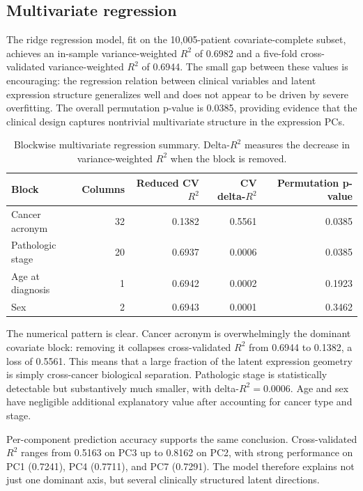\documentclass[11pt]{article}
\begin{document}
\subsection{Multivariate regression}
The ridge regression model, fit on the 10,005-patient covariate-complete subset, achieves an in-sample variance-weighted $R^2$ of 0.6982 and a five-fold cross-validated variance-weighted $R^2$ of 0.6944. The small gap between these values is encouraging: the regression relation between clinical variables and latent expression structure generalizes well and does not appear to be driven by severe overfitting. The overall permutation p-value is 0.0385, providing evidence that the clinical design captures nontrivial multivariate structure in the expression PCs.

\begin{table}[H]
\centering
\caption{Blockwise multivariate regression summary. Delta-$R^2$ measures the decrease in variance-weighted $R^2$ when the block is removed.}
\begin{tabular}{lrrrr}
\toprule
\textbf{Block} & \textbf{Columns} & \textbf{Reduced CV $R^2$} & \textbf{CV delta-$R^2$} & \textbf{Permutation p-value} \\
\midrule
Cancer acronym & 32 & 0.1382 & 0.5561 & 0.0385 \\
Pathologic stage & 20 & 0.6937 & 0.0006 & 0.0385 \\
Age at diagnosis & 1 & 0.6942 & 0.0002 & 0.1923 \\
Sex & 2 & 0.6943 & 0.0001 & 0.3462 \\
\bottomrule
\end{tabular}
\label{tab:regression-blocks}
\end{table}

The numerical pattern is clear. Cancer acronym is overwhelmingly the dominant covariate block: removing it collapses cross-validated $R^2$ from 0.6944 to 0.1382, a loss of 0.5561. This means that a large fraction of the latent expression geometry is simply cross-cancer biological separation. Pathologic stage is statistically detectable but substantively much smaller, with delta-$R^2 = 0.0006$. Age and sex have negligible additional explanatory value after accounting for cancer type and stage.

Per-component prediction accuracy supports the same conclusion. Cross-validated $R^2$ ranges from 0.5163 on PC3 up to 0.8162 on PC2, with strong performance on PC1 (0.7241), PC4 (0.7711), and PC7 (0.7291). The model therefore explains not just one dominant axis, but several clinically structured latent directions.
\end{document}
